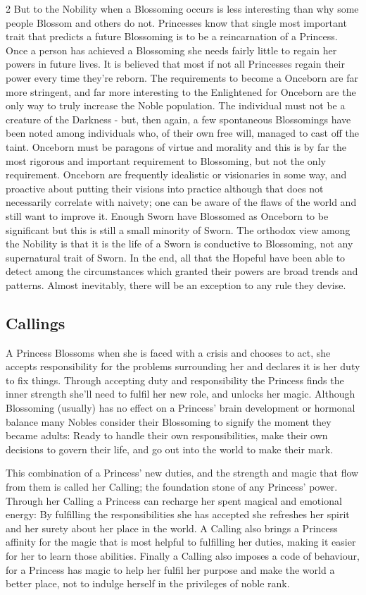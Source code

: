\begin{multicols}{2}
But to the Nobility when a Blossoming occurs is less interesting than why some people Blossom and others do not. Princesses know that single most important trait that predicts a future Blossoming is to be a reincarnation of a Princess. Once a person has achieved a Blossoming she needs fairly little to regain her powers in future lives. It is believed that most if not all Princesses regain their power every time they're reborn. The requirements to become a Onceborn are far more stringent, and far more interesting to the Enlightened for Onceborn are the only way to truly increase the Noble population. The individual must not be a creature of the Darkness - but, then again, a few spontaneous Blossomings have been noted among individuals who, of their own free will, managed to cast off the taint. Onceborn must be paragons of virtue and morality and this is by far the most rigorous and important requirement to Blossoming, but not the only requirement. Onceborn are frequently idealistic or visionaries in some way, and proactive about putting their visions into practice although that does not necessarily correlate with naivety; one can be aware of the flaws of the world and still 
want to improve it. Enough Sworn have Blossomed as Onceborn to be significant but this is still a small minority of Sworn. The orthodox view among the Nobility is that it is the life of a Sworn is conductive to Blossoming, not any supernatural trait of Sworn. In the end, all that the Hopeful have been able to detect among the circumstances which granted their powers are broad trends and patterns. Almost inevitably, there will be an exception to any rule they devise.

\subsection*{Callings}

A Princess Blossoms when she is faced with a crisis and chooses to act, she accepts responsibility for the problems surrounding her and declares it is her duty to fix things. Through accepting duty and responsibility the Princess finds the inner strength she'll need to fulfil her new role, and unlocks her magic. Although Blossoming (usually) has no effect on a Princess' brain development or hormonal balance many Nobles consider their Blossoming to signify the moment they became adults: Ready to handle their own responsibilities, make their own decisions to govern their life, and go out into the world to make their mark. 

This combination of a Princess' new duties, and the strength and magic that flow from them is called her Calling; the foundation stone of any Princess' power. Through her Calling a Princess can recharge her spent magical and emotional energy: By fulfilling the responsibilities she has accepted she refreshes her spirit and her surety about her place in the world. A Calling also brings a Princess affinity for the magic that is most helpful to fulfilling her duties, making it easier for her to learn those abilities. Finally a Calling also imposes a code of behaviour, for a Princess has magic to help her fulfil her purpose and make the world a better place, not to indulge herself in the privileges of noble rank.


\end{multicols}

